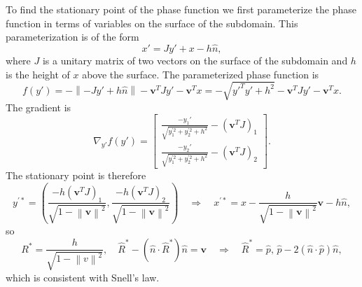 \documentclass{article}
\newcommand{\norm}[1]{\left\lVert #1 \right\rVert}
\theoremstyle{plain}
\begin{document}
To find the stationary point of the phase function we first parameterize the phase function
in terms of variables on the surface of the subdomain. This parameterization is of the form
\begin{equation}
	x' = Jy' + x - h\hat{n},
\end{equation}
where $J$ is a unitary matrix of two vectors on the surface of the subdomain
and $h$ is the height of $x$ above the surface.
The parameterized phase function is
\begin{equation}
	f(y') = -\norm{-Jy' + h\hat{n}} - \mathbf{v}^T Jy' - \mathbf{v}^T x
	= - \sqrt{ y'^Ty' + h^2 } - \mathbf{v}^T Jy' - \mathbf{v}^T x.
\end{equation}
The gradient is
\begin{equation}
	\nabla_{y'} f(y') = 
	\begin{bmatrix}
		\frac{-y_1'}{\sqrt{y_1^{'2} + y_2^{'2} + h^2}} - (\mathbf{v}^TJ)_1 \\
		\frac{-y_2'}{\sqrt{y_1^{'2} + y_2^{'2} + h^2}} - (\mathbf{v}^TJ)_2
	\end{bmatrix}.
\end{equation}
The stationary point is therefore
\begin{equation}
	y^{'*} = \left( \frac{-h(\mathbf{v}^TJ)_1}{\sqrt{ 1 - \norm{\mathbf{v}}^2 }}, \frac{-h(\mathbf{v}^TJ)_2}{\sqrt{ 1 - \norm{\mathbf{v}}^2 }} \right)
	\quad\Rightarrow\quad x^{'*} = x - \frac{h}{\sqrt{ 1 - \norm{\mathbf{v}}^2 }}\mathbf{v} - h\hat{n},
\end{equation}
so
\begin{equation}
	R^* = \frac{h}{\sqrt{1-\norm{v}^2}},
	\quad \hat{R}^* - \left( \hat{n}\cdot\hat{R}^* \right)\hat{n} = \mathbf{v}
	\quad\Rightarrow\quad \hat{R}^* =  \hat{p}\text{, } \hat{p} - 2\left( \hat{n}\cdot\hat{p} \right)\hat{n},
\end{equation}
which is consistent with Snell's law.
\end{document}
